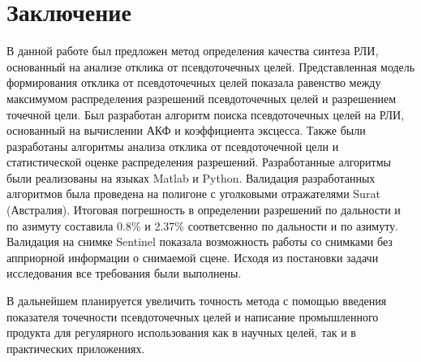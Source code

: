 \chapter{Заключение}
\label{sec:Chapter5} 

	В данной работе был предложен метод определения качества синтеза РЛИ, основанный на анализе отклика от псевдоточечных целей. Представленная модель формирования отклика от псевдоточечных целей показала равенство между максимумом распределения разрешений псевдоточечных целей и разрешением точечной цели. Был разработан алгоритм поиска псевдоточечных целей на РЛИ, основанный на вычислении АКФ и коэффициента эксцесса. Также были разработаны алгоритмы анализа отклика от псевдоточечной цели и статистической оценке распределения разрешений. Разработанные алгоритмы были реализованы на языках Matlab и Python. Валидация разработанных алгоритмов была проведена на полигоне с уголковыми отражателями Surat (Австралия). Итоговая погрешность в определении разрешений по дальности и по азимуту составила 0.8\% и 2.37\% соответсвенно по дальности и по азимуту. Валидация на снимке Sentinel показала возможность работы со снимками без апприорной информации о снимаемой сцене. Исходя из постановки задачи исследования все требования были выполнены. 

	В дальнейшем планируется увеличить точность метода с помощью введения показателя точечности псевдоточечных целей и написание промышленного продукта для регулярного использования как в научных целей, так и в практических приложениях.

\newpage
